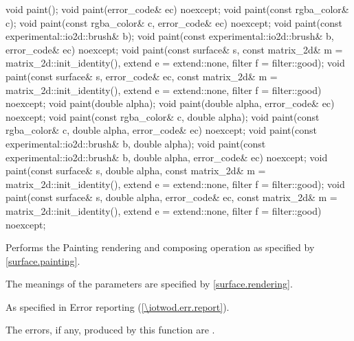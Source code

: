 \begin{itemdecl}
void paint();
void paint(error_code& ec) noexcept;
void paint(const rgba_color& c);
void paint(const rgba_color& c, error_code& ec) noexcept;
void paint(const experimental::io2d::brush& b);
void paint(const experimental::io2d::brush& b, error_code& ec) noexcept;
void paint(const surface& s,
  const matrix_2d& m = matrix_2d::init_identity(), extend e = extend::none,
  filter f = filter::good);
void paint(const surface& s, error_code& ec,
  const matrix_2d& m = matrix_2d::init_identity(), extend e = extend::none,
  filter f = filter::good) noexcept;
void paint(double alpha);
void paint(double alpha, error_code& ec) noexcept;
void paint(const rgba_color& c, double alpha);
void paint(const rgba_color& c, double alpha, error_code& ec) noexcept;
void paint(const experimental::io2d::brush& b, double alpha);
void paint(const experimental::io2d::brush& b, double alpha,
  error_code& ec) noexcept;
void paint(const surface& s, double alpha,
  const matrix_2d& m = matrix_2d::init_identity(), extend e = extend::none, 
  filter f = filter::good);
void paint(const surface& s, double alpha, error_code& ec, 
  const matrix_2d& m = matrix_2d::init_identity(), extend e = extend::none,
  filter f = filter::good) noexcept;
\end{itemdecl}
\begin{itemdescr}
\pnum
\effects
Performs the Painting rendering and composing operation as specified by \ref{surface.painting}.

\pnum
The meanings of the parameters are specified by \ref{surface.rendering}.

\pnum
\throws
As specified in Error reporting (\ref{\iotwod.err.report}).

\pnum
\errors
The errors, if any, produced by this function are .
\end{itemdescr}

